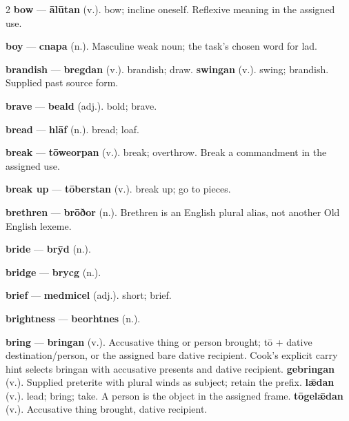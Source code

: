\begin{multicols}{2}
\textbf{bow} — \textbf{ālūtan} (v.). bow; incline oneself. Reflexive meaning in the assigned use.\par
\textbf{boy} — \textbf{cnapa} (n.). Masculine weak noun; the task's chosen word for lad.\par
\textbf{brandish} — \textbf{bregdan} (v.). brandish; draw. \textbf{swingan} (v.). swing; brandish. Supplied past source form.\par
\textbf{brave} — \textbf{beald} (adj.). bold; brave.\par
\textbf{bread} — \textbf{hlāf} (n.). bread; loaf.\par
\textbf{break} — \textbf{tōweorpan} (v.). break; overthrow. Break a commandment in the assigned use.\par
\textbf{break up} — \textbf{tōberstan} (v.). break up; go to pieces.\par
\textbf{brethren} — \textbf{brōðor} (n.). Brethren is an English plural alias, not another Old English lexeme.\par
\textbf{bride} — \textbf{brȳd} (n.).\par
\textbf{bridge} — \textbf{brycg} (n.).\par
\textbf{brief} — \textbf{medmicel} (adj.). short; brief.\par
\textbf{brightness} — \textbf{beorhtnes} (n.).\par
\textbf{bring} — \textbf{bringan} (v.). Accusative thing or person brought; tō + dative destination/person, or the assigned bare dative recipient. Cook's explicit carry hint selects bringan with accusative presents and dative recipient. \textbf{gebringan} (v.). Supplied preterite with plural winds as subject; retain the prefix. \textbf{lǣdan} (v.). lead; bring; take. A person is the object in the assigned frame. \textbf{tōgelǣdan} (v.). Accusative thing brought, dative recipient.\par

\end{multicols}
